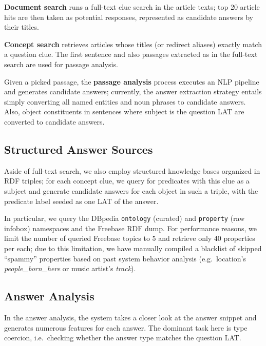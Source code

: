 \documentclass{poster15}
\begin{document}
\textbf{Document search} \cite{WatsonIR} runs a full-text clue search in the article texts;
top 20 article hits are then taken as potential responses,
represented as candidate answers by their titles.

\textbf{Concept search} retrieves articles whose titles (or redirect aliases) exactly match a question clue.
The first sentence and also passages extracted as in the full-text search are used for passage analysis.

Given a picked passage, the \textbf{passage analysis} process executes an NLP pipeline and generates candidate answers;
currently, the answer extraction strategy entails simply converting all named entities and noun phrases to candidate answers.
Also, object constituents in sentences where subject is the question LAT are converted to candidate answers.

\subsection{Structured Answer Sources}

Aside of full-text search, we also employ structured knowledge bases organized in RDF triples;
for each concept clue, we query for predicates with this clue as a subject
and generate candidate answers for each object in such a triple, with the predicate label seeded as one LAT of the answer.

In particular, we query the DBpedia \texttt{ontology} (curated) and \texttt{property} (raw infobox)
namespaces and the Freebase RDF dump.
For performance reasons, we limit the number of queried Freebase topics to 5 and retrieve only 40 properties per each;
due to this limitation, we have manually compiled a blacklist of skipped
``spammy'' properties based on past system behavior analysis
(e.g.\ location's \textit{people\_born\_here} or music artist's \textit{track}).

\subsection{Answer Analysis}

In the answer analysis, the system takes a closer look at the answer snippet
and generates numerous features for each answer.
The dominant task here is type coercion,
i.e.\ checking whether the answer type matches the question LAT.
\end{document}
